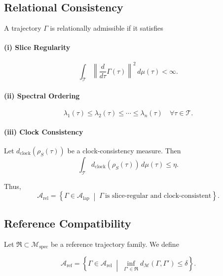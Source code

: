 \documentclass[11pt,a4paper]{article}
\theoremstyle{definition}
\theoremstyle{remark}
\begin{document}
\subsection{Relational Consistency}

A trajectory $\Gamma$ is relationally admissible if it satisfies

\paragraph{(i) Slice Regularity}
\begin{equation}
\int_{\mathcal{T}}
\left\|
\frac{d}{d\tau}\Gamma(\tau)
\right\|^2
\, d\mu(\tau)
< \infty.
\end{equation}

\paragraph{(ii) Spectral Ordering}
\begin{equation}
\lambda_1(\tau) \le \lambda_2(\tau) \le \cdots \le \lambda_n(\tau)
\quad \forall \tau \in \mathcal{T}.
\end{equation}

\paragraph{(iii) Clock Consistency}
Let $d_{\mathrm{clock}}(\rho_S(\tau))$ be a clock-consistency measure. Then
\begin{equation}
\int_{\mathcal{T}}
d_{\mathrm{clock}}(\rho_S(\tau))
\, d\mu(\tau)
\le \eta.
\end{equation}

Thus,
\begin{equation}
\mathcal{A}_{\mathrm{rel}}
=
\left\{
\Gamma \in \mathcal{A}_{\mathrm{lap}}
\;\middle|\;
\Gamma\ \text{is slice-regular and clock-consistent}
\right\}.
\end{equation}

\subsection{Reference Compatibility}

Let $\mathfrak{R} \subset \mathcal{M}_{\mathrm{spec}}$ be a reference trajectory family.
We define

\begin{equation}
\mathcal{A}_{\mathrm{ref}}
=
\left\{
\Gamma \in \mathcal{A}_{\mathrm{rel}}
\;\middle|\;
\inf_{\Gamma' \in \mathfrak{R}}
d_{\mathcal{M}}(\Gamma,\Gamma')
\le \delta
\right\}.
\end{equation}
\end{document}
